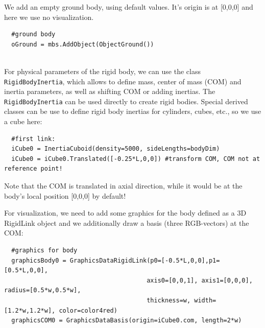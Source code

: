 \noindent We add an empty ground body, using default values. It's origin is at [0,0,0] and here we use no visualization.
\pythonstyle\begin{lstlisting}
  #ground body
  oGround = mbs.AddObject(ObjectGround())
\end{lstlisting}

\horizontalRuler\\
\noindent For physical parameters of the rigid body, we can use the class \texttt{RigidBodyInertia}, which allows to define mass, center of mass (COM) and inertia parameters, as well as shifting COM or adding inertias.
The \texttt{RigidBodyInertia} can be used directly to create rigid bodies. Special derived classes can be use to define rigid body inertias for cylinders, cubes, etc., so we use a cube here:
\pythonstyle\begin{lstlisting}
  #first link:
  iCube0 = InertiaCuboid(density=5000, sideLengths=bodyDim)
  iCube0 = iCube0.Translated([-0.25*L,0,0]) #transform COM, COM not at reference point!
\end{lstlisting}
Note that the COM is translated in axial direction, while it would be at the body's local position [0,0,0] by default!

\noindent For visualization, we need to add some graphics for the body defined as a 3D RigidLink object and we additionally draw a basis (three RGB-vectors) at the COM:
\pythonstyle\begin{lstlisting}
  #graphics for body
  graphicsBody0 = GraphicsDataRigidLink(p0=[-0.5*L,0,0],p1=[0.5*L,0,0], 
                                       axis0=[0,0,1], axis1=[0,0,0], radius=[0.5*w,0.5*w], 
                                       thickness=w, width=[1.2*w,1.2*w], color=color4red)
  graphicsCOM0 = GraphicsDataBasis(origin=iCube0.com, length=2*w)
\end{lstlisting}

